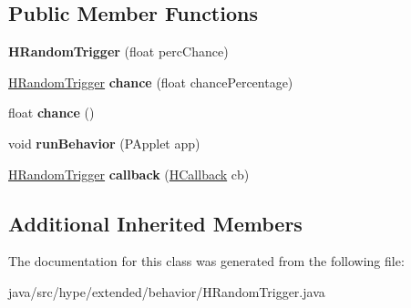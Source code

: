 \subsection*{Public Member Functions}
\begin{DoxyCompactItemize}
\item 
\hypertarget{classhype_1_1extended_1_1behavior_1_1_h_random_trigger_a46372f5839b0bbf5a733b4274f3297de}{{\bfseries H\-Random\-Trigger} (float perc\-Chance)}\label{classhype_1_1extended_1_1behavior_1_1_h_random_trigger_a46372f5839b0bbf5a733b4274f3297de}

\item 
\hypertarget{classhype_1_1extended_1_1behavior_1_1_h_random_trigger_aafaad070e76c64a894948827d3722582}{\hyperlink{classhype_1_1extended_1_1behavior_1_1_h_random_trigger}{H\-Random\-Trigger} {\bfseries chance} (float chance\-Percentage)}\label{classhype_1_1extended_1_1behavior_1_1_h_random_trigger_aafaad070e76c64a894948827d3722582}

\item 
\hypertarget{classhype_1_1extended_1_1behavior_1_1_h_random_trigger_a9e509fab96e9f0a209975ece715ac38f}{float {\bfseries chance} ()}\label{classhype_1_1extended_1_1behavior_1_1_h_random_trigger_a9e509fab96e9f0a209975ece715ac38f}

\item 
\hypertarget{classhype_1_1extended_1_1behavior_1_1_h_random_trigger_a16eb82e839caef4d885dbf5aca84c0fa}{void {\bfseries run\-Behavior} (P\-Applet app)}\label{classhype_1_1extended_1_1behavior_1_1_h_random_trigger_a16eb82e839caef4d885dbf5aca84c0fa}

\item 
\hypertarget{classhype_1_1extended_1_1behavior_1_1_h_random_trigger_aff77e0d939b9471517428e56a84f3b24}{\hyperlink{classhype_1_1extended_1_1behavior_1_1_h_random_trigger}{H\-Random\-Trigger} {\bfseries callback} (\hyperlink{interfacehype_1_1core_1_1interfaces_1_1_h_callback}{H\-Callback} cb)}\label{classhype_1_1extended_1_1behavior_1_1_h_random_trigger_aff77e0d939b9471517428e56a84f3b24}

\end{DoxyCompactItemize}
\subsection*{Additional Inherited Members}


The documentation for this class was generated from the following file\-:\begin{DoxyCompactItemize}
\item 
java/src/hype/extended/behavior/H\-Random\-Trigger.\-java\end{DoxyCompactItemize}
